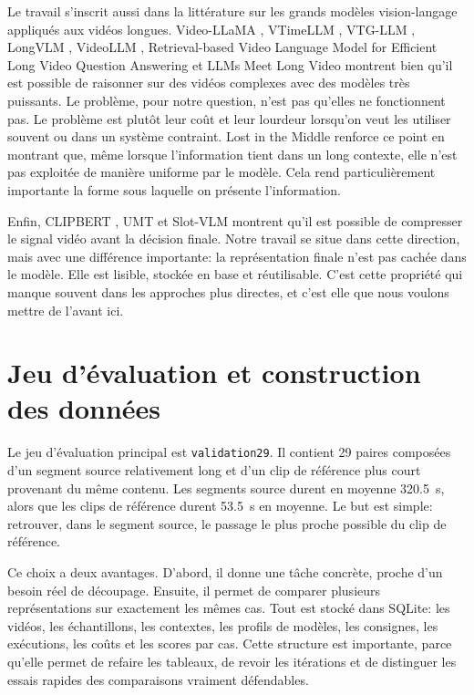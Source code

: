 Le travail s'inscrit aussi dans la litt\'erature sur les grands mod\`eles vision-langage appliqu\'es aux vid\'eos longues. Video-LLaMA \cite{anonymous2023_videollama}, VTimeLLM \cite{huang2024_vtimeLLM}, VTG-LLM \cite{guo2024_vtgLLM}, LongVLM \cite{weng2024}, VideoLLM \cite{chen2023}, Retrieval-based Video Language Model for Efficient Long Video Question Answering \cite{xu2023} et LLMs Meet Long Video \cite{li2024} montrent bien qu'il est possible de raisonner sur des vid\'eos complexes avec des mod\`eles tr\`es puissants. Le probl\`eme, pour notre question, n'est pas qu'elles ne fonctionnent pas. Le probl\`eme est plut\^ot leur co\^ut et leur lourdeur lorsqu'on veut les utiliser souvent ou dans un syst\`eme contraint. Lost in the Middle \cite{liu2024_lost} renforce ce point en montrant que, m\^eme lorsque l'information tient dans un long contexte, elle n'est pas exploit\'ee de mani\`ere uniforme par le mod\`ele. Cela rend particuli\`erement importante la forme sous laquelle on pr\'esente l'information.

Enfin, CLIPBERT \cite{lei2021_clipbert}, UMT \cite{liu2022_umt} et Slot-VLM \cite{xu2024} montrent qu'il est possible de compresser le signal vid\'eo avant la d\'ecision finale. Notre travail se situe dans cette direction, mais avec une diff\'erence importante: la repr\'esentation finale n'est pas cach\'ee dans le mod\`ele. Elle est lisible, stock\'ee en base et r\'eutilisable. C'est cette propri\'et\'e qui manque souvent dans les approches plus directes, et c'est elle que nous voulons mettre de l'avant ici.

\section{Jeu d'\'evaluation et construction des donn\'ees}



Le jeu d'\'evaluation principal est \texttt{validation29}. Il contient 29 paires compos\'ees d'un segment source relativement long et d'un clip de r\'ef\'erence plus court provenant du m\^eme contenu. Les segments source durent en moyenne 320.5~s, alors que les clips de r\'ef\'erence durent 53.5~s en moyenne. Le but est simple: retrouver, dans le segment source, le passage le plus proche possible du clip de r\'ef\'erence.

Ce choix a deux avantages. D'abord, il donne une t\^ache concr\`ete, proche d'un besoin r\'eel de d\'ecoupage. Ensuite, il permet de comparer plusieurs repr\'esentations sur exactement les m\^emes cas. Tout est stock\'e dans SQLite: les vid\'eos, les \'echantillons, les contextes, les profils de mod\`eles, les consignes, les ex\'ecutions, les co\^uts et les scores par cas. Cette structure est importante, parce qu'elle permet de refaire les tableaux, de revoir les it\'erations et de distinguer les essais rapides des comparaisons vraiment d\'efendables.

